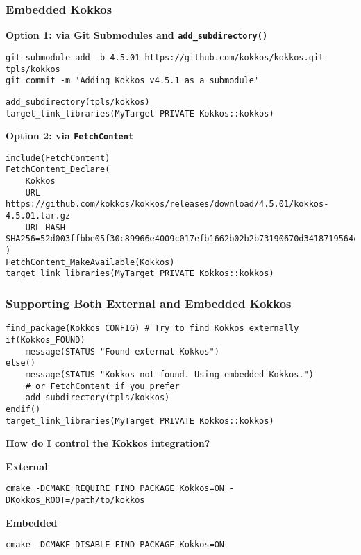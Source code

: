 \begin{frame}[fragile]
\frametitle{Embedded Kokkos}

\textbf{Option 1: via Git Submodules and \texttt{add_subdirectory()}}
\begin{verbatim}
git submodule add -b 4.5.01 https://github.com/kokkos/kokkos.git tpls/kokkos
git commit -m 'Adding Kokkos v4.5.1 as a submodule'
\end{verbatim}
\begin{verbatim}
add_subdirectory(tpls/kokkos)
target_link_libraries(MyTarget PRIVATE Kokkos::kokkos)
\end{verbatim}

\vspace{2eM}

\textbf{Option 2: via \texttt{FetchContent}}
\begin{verbatim}
include(FetchContent)
FetchContent_Declare(
    Kokkos
    URL      https://github.com/kokkos/kokkos/releases/download/4.5.01/kokkos-4.5.01.tar.gz
    URL_HASH SHA256=52d003ffbbe05f30c89966e4009c017efb1662b02b2b73190670d3418719564c
)
FetchContent_MakeAvailable(Kokkos)
target_link_libraries(MyTarget PRIVATE Kokkos::kokkos)
\end{verbatim}
\end{frame}

\begin{frame}[fragile]
\frametitle{Supporting Both External and Embedded Kokkos}

\begin{verbatim}
find_package(Kokkos CONFIG) # Try to find Kokkos externally
if(Kokkos_FOUND)
    message(STATUS "Found external Kokkos")
else()
    message(STATUS "Kokkos not found. Using embedded Kokkos.")
    # or FetchContent if you prefer
    add_subdirectory(tpls/kokkos)
endif()
target_link_libraries(MyTarget PRIVATE Kokkos::kokkos)
\end{verbatim}

\pause

\vspace{1eM}
\textbf{How do I control the Kokkos integration?}

\pause

\vspace{1eM}
\textbf{External}
\begin{verbatim}
cmake -DCMAKE_REQUIRE_FIND_PACKAGE_Kokkos=ON -DKokkos_ROOT=/path/to/kokkos
\end{verbatim}

\vspace{1eM}
\textbf{Embedded}
\begin{verbatim}
cmake -DCMAKE_DISABLE_FIND_PACKAGE_Kokkos=ON
\end{verbatim}

\end{frame}


